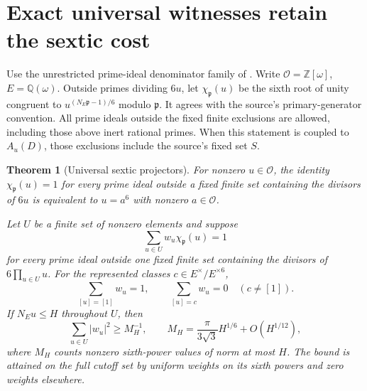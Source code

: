 \documentclass[11pt]{article}
\newtheorem{theorem}{Theorem}
\theoremstyle{remark}\newtheorem{remark}[theorem]{Remark}
\begin{document}
\section{Exact universal witnesses retain the sextic cost}
Use the unrestricted prime-ideal denominator family of
\cite[p.~4, \S2.2]{OpenAI1112}. Write
$\mathcal O=\mathbb Z[\omega]$, $E=\mathbb Q(\omega)$.
Outside primes dividing $6u$, let $\chi_{\mathfrak p}(u)$ be
the sixth root of unity congruent to
$u^{(N_E\mathfrak p-1)/6}$ modulo $\mathfrak p$.
It agrees with the source's primary-generator convention.
All prime ideals outside the fixed finite exclusions are
allowed, including those above inert rational primes.
When this statement is coupled to $A_u(D)$, those exclusions
include the source's fixed set $S$.

\begin{theorem}[Universal sextic projectors]\label{thm:projector}
For nonzero $u\in\mathcal O$, the identity
$\chi_{\mathfrak p}(u)=1$ for every prime ideal outside
a fixed finite set containing the divisors of $6u$
is equivalent to $u=a^6$ with nonzero $a\in\mathcal O$.

Let $U$ be a finite set of nonzero elements and suppose
\[
 \sum_{u\in U}w_u\chi_{\mathfrak p}(u)=1
\]
for every prime ideal outside one fixed finite set
containing the divisors of $6\prod_{u\in U}u$.
For the represented classes $c\in E^\times/E^{\times6}$,
\[
 \sum_{[u]=[1]}w_u=1,\qquad
 \sum_{[u]=c}w_u=0\quad(c\ne[1]).
\]
If $N_Eu\le H$ throughout $U$, then
\[
 \sum_{u\in U}|w_u|^2\ge M_H^{-1},\qquad
 M_H=\frac{\pi}{3\sqrt3}H^{1/6}+O(H^{1/12}),
\]
where $M_H$ counts nonzero sixth-power values of norm at most $H$.
The bound is attained on the full cutoff set by uniform weights
on its sixth powers and zero weights elsewhere.
\end{theorem}
\end{document}
